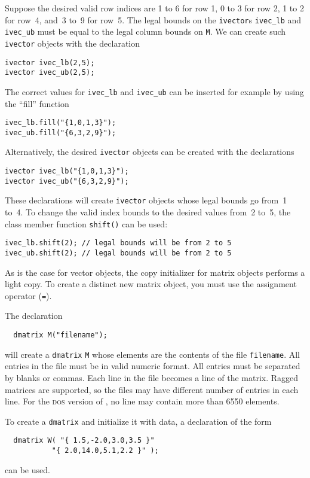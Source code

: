 \documentclass{admbmanual}
\begin{document}
Suppose the desired valid row indices are 1 to 6 for row 1,
0 to 3 for row 2, 1 to 2 for row~4, and~3 to~9 for row~5.
The legal bounds on the \texttt{ivector}s \texttt{ivec\_lb} and \texttt{ivec\_ub}
must be equal to the legal column bounds on \texttt{M}. We can create such
\texttt{ivector} objects with the declaration
\begin{lstlisting}
ivector ivec_lb(2,5);
ivector ivec_ub(2,5);
\end{lstlisting}

The correct values for \texttt{ivec\_lb} and \texttt{ivec\_ub} can
be inserted for example by using the ``fill'' function
\begin{lstlisting}
ivec_lb.fill("{1,0,1,3}"); 
ivec_ub.fill("{6,3,2,9}"); 
\end{lstlisting}

Alternatively, the desired \texttt{ivector} objects can be created with the
declarations
\begin{lstlisting}
ivector ivec_lb("{1,0,1,3}"); 
ivector ivec_ub("{6,3,2,9}"); 
\end{lstlisting}

These declarations will create \texttt{ivector} objects whose legal bounds
go from~1 to~4. To change the valid index bounds to the desired values
from~2 to~5, the class member function \texttt{shift()} can be used: 
\begin{lstlisting}
ivec_lb.shift(2); // legal bounds will be from 2 to 5
ivec_ub.shift(2); // legal bounds will be from 2 to 5
\end{lstlisting}

As is the case for vector objects, the copy initializer for matrix objects
performs a light copy. To create a distinct new matrix object, you must
use the assignment operator (\texttt{=}).

The declaration
\begin{lstlisting}
  dmatrix M("filename");        
\end{lstlisting}
will create a \texttt{dmatrix} \texttt{M} whose elements are the contents 
of the file
\texttt{filename}. 
All entries in the file
must be in valid numeric format. All entries must be separated by blanks
or commas.
Each line in the file becomes a line of the matrix. Ragged matrices are 
supported, so the files may have different number of entries in each 
line. For the \textsc{dos} version of \scAD, no line may contain more than 6550
elements. 

To create a \texttt{dmatrix} and initialize it with data, a declaration of
the form
\begin{lstlisting}
  dmatrix W( "{ 1.5,-2.0,3.0,3.5 }"
           "{ 2.0,14.0,5.1,2.2 }" );
\end{lstlisting}
can be used. 
\end{document}
